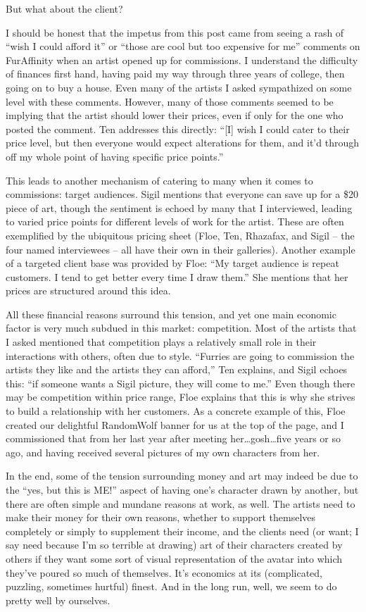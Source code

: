 But what about the client?

I should be honest that the impetus from this post came from seeing a rash of ``wish I could afford it'' or ``those are cool but too expensive for me'' comments on FurAffinity when an artist opened up for commissions.  I understand the difficulty of finances first hand, having paid my way through three years of college, then going on to buy a house.  Even many of the artists I asked sympathized on some level with these comments.  However, many of those comments seemed to be implying that the artist should lower their prices, even if only for the one who posted the comment.  Ten addresses this directly: ``[I] wish I could cater to their price level, but then everyone would expect alterations for them, and it'd through off my whole point of having specific price points.''

This leads to another mechanism of catering to many when it comes to commissions: target audiences.  Sigil mentions that everyone can save up for a \$20 piece of art, though the sentiment is echoed by many that I interviewed, leading to varied price points for different levels of work for the artist.  These are often exemplified by the ubiquitous pricing sheet (Floe, Ten, Rhazafax, and Sigil – the four named interviewees – all have their own in their galleries).  Another example of a targeted client base was provided by Floe: ``My target audience is repeat customers.  I tend to get better every time I draw them.''  She mentions that her prices are structured around this idea.

All these financial reasons surround this tension, and yet one main economic factor is very much subdued in this market: competition.  Most of the artists that I asked mentioned that competition plays a relatively small role in their interactions with others, often due to style.  ``Furries are going to commission the artists they like and the artists they can afford,'' Ten explains, and Sigil echoes this: ``if someone wants a Sigil picture, they will come to me.''  Even though there may be competition within price range, Floe explains that this is why she strives to build a relationship with her customers.  As a concrete example of this, Floe created our delightful RandomWolf banner for us at the top of the page, and I commissioned that from her last year after meeting her…gosh…five years or so ago, and having received several pictures of my own characters from her.

In the end, some of the tension surrounding money and art may indeed be due to the ``yes, but this is ME!'' aspect of having one's character drawn by another, but there are often simple and mundane reasons at work, as well.  The artists need to make their money for their own reasons, whether to support themselves completely or simply to supplement their income, and the clients need (or want; I say need because I'm so terrible at drawing) art of their characters created by others if they want some sort of visual representation of the avatar into which they've poured so much of themselves.  It's economics at its (complicated, puzzling, sometimes hurtful) finest.  And in the long run, well, we seem to do pretty well by ourselves.

